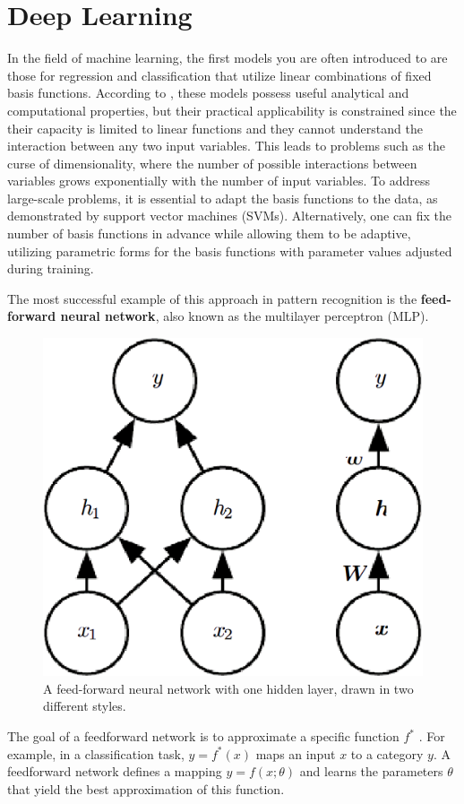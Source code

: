 \section{Deep Learning}

In the field of machine learning, the first models you
are often introduced to are those for regression
and classification that utilize linear
combinations of fixed basis functions.
According to \cite{Bishop:2008aa},
these models possess useful analytical and computational properties,
but their practical applicability is constrained 
since the their capacity is limited to linear functions
and they cannot understand the interaction between any two input variables.
This leads to problems such as the curse of dimensionality,
where the number of possible interactions between variables grows exponentially
with the number of input variables.
To address large-scale problems, it is essential to adapt the basis functions
to the data, as demonstrated by support vector machines (SVMs).
Alternatively, one can fix the number of basis functions in advance while
allowing them to be adaptive, utilizing parametric forms for the basis
functions with parameter values adjusted during training.

The most successful example of this approach in pattern recognition is the
\textbf{feed-forward neural network},
also known as the multilayer perceptron (MLP).
\begin{figure}[h]
    \centering
    \includegraphics[width=.5\textwidth]{figures/ch3/1. mlp.png}
    \caption{A feed-forward neural network with one hidden layer, drawn 
    in two different styles.}
    \label{fig:mlp}
\end{figure}

The goal of a feedforward network is to approximate a specific function
\( f^* \) 
\cite{goodfellow2016deep}. For example, in a classification task,
\( y = f^*(x) \) maps an input \( x \) to a category \( y \).
A feedforward network defines a mapping \( y = f(x; \theta) \) and
learns the parameters \( \theta \) that yield the best approximation
of this function.

